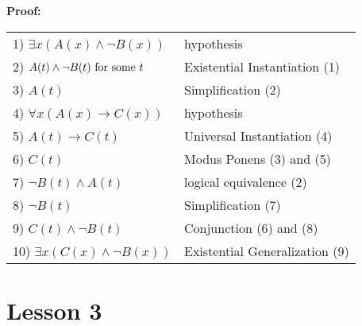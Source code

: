 \documentclass[11pt]{amsart}
\begin{document}
\begin{enumerate}
{\color{blue}
\textbf{Proof:}
\begin{tabular}[t]{l l}
1) $\exists{x}(A(x) \land \lnot B(x))$& hypothesis \\
2) $A(t)\land \lnot B(t) \hbox{ for some } t $& Existential Instantiation (1) \\ 
3) $A(t)$& Simplification (2) \\ 
4) $\forall{x}(A(x) \to C(x))$& hypothesis \\ 
5) $A(t)\to C(t)$& Universal Instantiation (4) \\ 
6) $C(t)$& Modus Ponens (3) and (5) \\ 
7) $\lnot B(t) \land A(t)$& logical equivalence (2) \\ 
8) $\lnot B(t)$& Simplification (7) \\ 
9) $C(t)\land \lnot B(t)$& Conjunction (6) and (8) \\ 
10) $\exists{x}(C(x)\land \lnot B(x))$& Existential Generalization (9)
\end{tabular}
}

\end{enumerate}


\section{Lesson 3}
\end{document}
